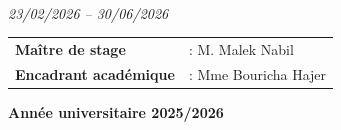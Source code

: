 \documentclass[12pt,a4paper]{report}
\begin{document}
\begin{titlepage}
\begin{center}
\begin{minipage}{0.72\textwidth}
{}
\end{minipage}\\[0.25cm]
{\small\itshape 23/02/2026 -- 30/06/2026}
\end{center}
\vspace{1.05cm}
\noindent\hspace*{0.45cm}
\begin{tabular}{@{}p{4.4cm}p{8.8cm}@{}}
\textbf{Maître de stage} & : M. Malek Nabil \\[0.18cm]
\textbf{Encadrant académique} & : Mme Bouricha Hajer
\end{tabular}
\vfill
\begin{center}{\scriptsize\bfseries Année universitaire 2025/2026}\end{center}
\end{titlepage}
\restoregeometry
\clearpage
\end{document}
